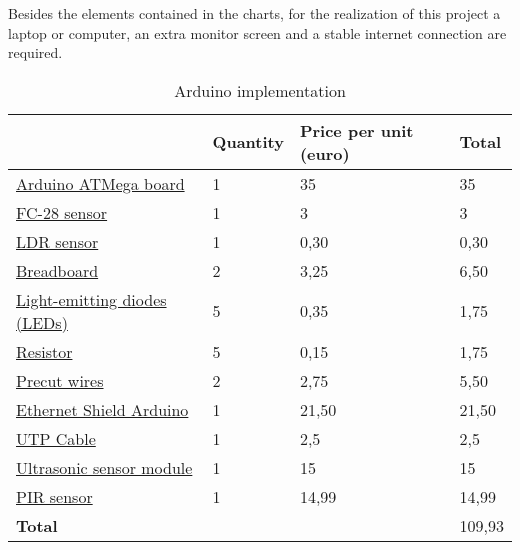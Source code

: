 Besides the elements contained in the charts, for the realization of this project a laptop or computer, an extra monitor screen and a stable internet connection are required.

\begin{table}[H]
\caption{Arduino implementation}
\begin{tabular}{llll}
\hline
	& \textbf{Quantity}& \textbf{Price per unit (euro)}& \textbf{Total} \\ \hline
	\rowcolor{lightgray}
\href{https://store.arduino.cc/arduino-mega-2560-rev3}{Arduino ATMega board} & 1                                        & 35                                                 & 35                                    \\
\href{https://televoz.org/9496_128fc28_modulo-para-arduino-igrometro---sensor-de-humedad-fc28}{FC-28 sensor}         & 1                                        & 3                                                  & 3                                     \\
	\rowcolor{lightgray}
\href{https://televoz.org/5593_000ldr01_celula-fotoconductora-ldr-01}{LDR sensor}	     & 1                                        &0,30                                                    & 0,30                                      \\
\href{https://televoz.org/4859_104bp001_placa-board-400-puntos-bp001}{Breadboard}	     & 2                                        & 3,25                                                    & 6,50                                      \\
\rowcolor{lightgray}
\href{https://televoz.org/4955_105led3rojo-ab_diodo-led-3-mm-rojo-alto-brillo}{Light-emitting diodes (LEDs)}                 & 5                                        &  0,35                                                  &1,75          \\
\href{https://televoz.org/5551_001R_RESISTENCIA}{Resistor}                 & 5                                        &  0,15                                                  &1,75 \\
\rowcolor{lightgray}
\href{https://televoz.org/4861_104boardcab20_cable-para-board-20-cms-macho-macho-10-unidades}{Precut wires} & 2 & 2,75 & 5,50 \\
\href{https://store.arduino.cc/arduino-ethernet-shield-2}{Ethernet Shield Arduino} & 1 & 21,50 & 21,50 \\
\rowcolor{lightgray}
\href{https://televoz.org/conexion-utp-cat6-5-00-mts-tr4000029}{UTP Cable} & 1 & 2,5 & 2,5 \\
\href{https://www.seeedstudio.com/Ultra-Sonic-range-measurement-module-p-626.html}{Ultrasonic sensor module} & 1 & 15 & 15 \\
\rowcolor{lightgray}
\href{https://www.parallax.com/product/pir-sensor-with-led-signal/}{PIR sensor} & 1 & 14,99 & 14,99 \\
\textbf{Total} & & & 109,93 \\
\end{tabular}
\end{table}

